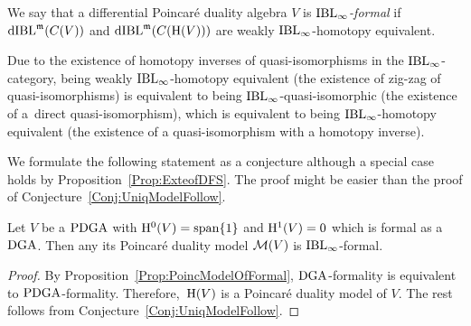 \documentclass[\MainFolder/Text.tex]{subfiles}
\begin{document}
\begin{Definition}\label{Def:IBLFormality}
We say that a differential Poincar\'e duality algebra $V$ is \emph{$\mathrm{IBL}_\infty$-formal} if $\mathrm{dIBL}^{\mathfrak{m}}(C(V))$ and $\mathrm{dIBL}^{\mathfrak{m}}(C(\mathrm{H}(V)))$ are weakly $\mathrm{IBL}_\infty$-homotopy equivalent.
\end{Definition}

Due to the existence of homotopy inverses of quasi-isomorphisms in the $\mathrm{IBL}_\infty$-category, being weakly $\mathrm{IBL}_\infty$-homotopy equivalent (the existence of zig-zag of quasi-isomorphisms) is equivalent to being $\mathrm{IBL}_\infty$-quasi-isomorphic (the existence of a~direct quasi-isomorphism), which is equivalent to being $\mathrm{IBL}_\infty$-homotopy equivalent (the existence of a quasi-isomorphism with a homotopy inverse).

We formulate the following statement as a conjecture although a special case holds by Proposition~\ref{Prop:ExteofDFS}.
The proof might be easier than the proof of Conjecture~\ref{Conj:UniqModelFollow}.

\begin{Conjecture}\label{Con:DGAIBLForm}
Let $V$ be a $\mathrm{PDGA}$ with $\mathrm{H}^0(V)=\mathrm{span}\{1\}$ and $\mathrm{H}^1(V)=0$ which is formal as a $\mathrm{DGA}$.
Then any its Poincar\'e duality model $\mathcal{M}(V)$ is $\mathrm{IBL}_\infty$-formal.
\end{Conjecture}
\begin{proof}
By Proposition~\ref{Prop:PoincModelOfFormal}, $\mathrm{DGA}$-formality is equivalent to $\mathrm{PDGA}$-formality. Therefore,~$\mathrm{H}(V)$ is a Poincar\'e duality model of $V$. The rest follows from Conjecture~\ref{Conj:UniqModelFollow}.
\end{proof}
\end{document}
